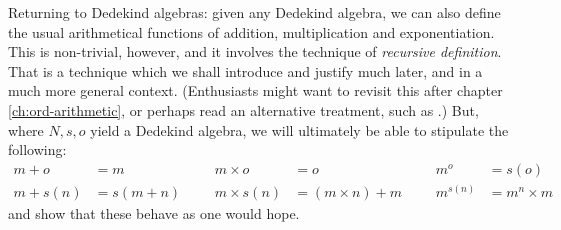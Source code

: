 \documentclass[../../../include/open-logic-section]{subfiles}
\begin{document}
Returning to Dedekind algebras: given any Dedekind algebra, we can also define the usual arithmetical functions of addition, multiplication and exponentiation. This is non-trivial, however, and it involves the technique of \emph{recursive definition}. That is a technique which we shall introduce and justify much later, and in a much more general context. (Enthusiasts might want to revisit this after chapter \ref{ch:ord-arithmetic}, or perhaps read an alternative treatment, such as \citeauthor{Potter2004} \citeyear[95--8]{Potter2004}.) But, where $N, s, o$ yield a Dedekind algebra, we will ultimately be able to stipulate the following:
\begin{align*}
	{m} + {o} &= {m} & & & {m} \times {o} &= {o} & & & {m}^{o} &= s(o)\\
{m} + {s}({n}) &= {s}({m}+{n}) &&& {m} \times {s}({n}) &= ({m}\times {n}) + {m}  & & & {m}^{{s}({n})} &= {m}^{n} \times {m}
\end{align*}
and show that these behave as one would hope.
\end{document}
